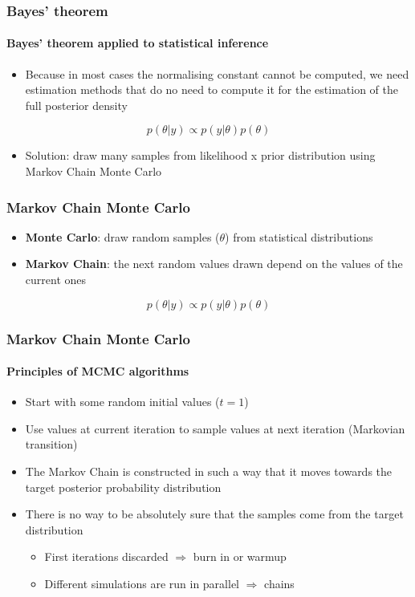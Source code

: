 \documentclass{beamer}
\begin{document}
\begin{frame}
\frametitle{Bayes’ theorem}
\framesubtitle{Bayes’ theorem applied to statistical inference}
\begin{itemize}
 \item{Because in most cases the normalising constant cannot be computed, we need estimation methods that do no need to compute it for the estimation of the full posterior density}
\end{itemize}
\vspace{.5cm}
\begin{Large}
$$p(\theta | y) \propto  p(y|\theta) p(\theta)$$
\end{Large}
\begin{itemize}
 \item{Solution: draw many samples from likelihood x prior distribution using Markov Chain Monte Carlo}
\end{itemize}
\end{frame}

\begin{frame}
\frametitle{Markov Chain Monte Carlo}
\begin{itemize}
 \item{\textbf{Monte Carlo}: draw random samples ($\theta$) from statistical distributions}
 \item{\textbf{Markov Chain}: the next random values drawn depend on the values of the current ones}
\end{itemize}
\begin{Large}
$$p(\theta | y) \propto  p(y|\theta) p(\theta)$$
\end{Large}
\end{frame}

\begin{frame}
\frametitle{Markov Chain Monte Carlo}
\framesubtitle{Principles of MCMC algorithms}
 \begin{itemize}
  \item{Start with some random initial values ($t=1$)}
  \item{Use values at current iteration to sample values at next iteration (Markovian transition)}
  \item{The Markov Chain is constructed in such a way that it moves towards the target posterior probability distribution}
  \item{There is no way to be absolutely sure that the samples come from the target distribution}
  \begin{itemize}
   \item{First iterations discarded $\Rightarrow$ burn in or warmup}
   \item{Different simulations are run in parallel $\Rightarrow$ chains}
  \end{itemize}
 \end{itemize}
\end{frame}
\end{document}
